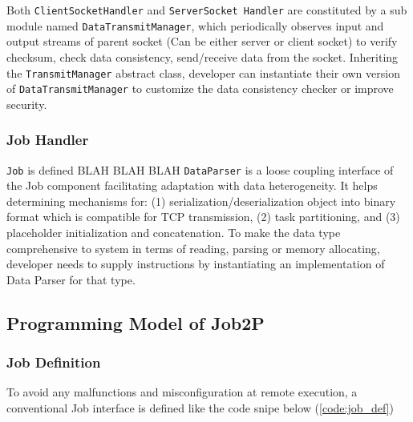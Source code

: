 \documentclass[conference]{IEEEtran}
\begin{document}
Both \texttt{ClientSocketHandler} and \texttt{ServerSocket Handler} are constituted by a sub module named \texttt{DataTransmitManager}, which periodically observes input and output streams of parent socket (Can be either server or client socket) to verify checksum, check data consistency, send/receive data from the socket. Inheriting the \texttt{TransmitManager} abstract class, developer can instantiate their own version of \texttt{DataTransmitManager} to customize the data consistency checker or improve security. 

\subsubsection{Job Handler}
\texttt{Job} is defined BLAH BLAH BLAH
\texttt{DataParser} is a loose coupling interface of the Job component facilitating adaptation with data heterogeneity. It helps determining mechanisms for: (1) serialization/deserialization object into binary format which is compatible for TCP transmission, (2) task partitioning, and (3) placeholder initialization and concatenation. To make the data type comprehensive to system in terms of reading, parsing or memory allocating, developer needs to supply instructions by instantiating an implementation of Data Parser for that type. 

\subsection{Programming Model of Job2P} 

\subsubsection{Job Definition}\label{job-description}

To avoid any malfunctions and misconfiguration at remote execution, a conventional Job interface is defined like the code snipe below (\ref{code:job_def}) \\

\noindent {}	
\end{document}
